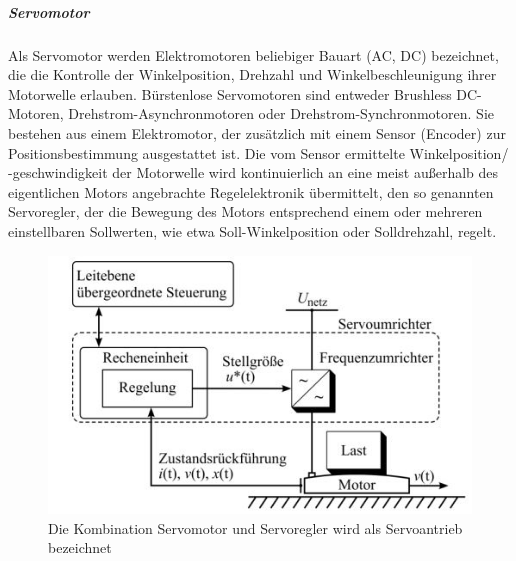 					\subparagraph{Servomotor}
						Als Servomotor werden Elektromotoren beliebiger Bauart (AC, DC) bezeichnet, die die Kontrolle der Winkelposition, Drehzahl und Winkelbeschleunigung ihrer Motorwelle erlauben. Bürstenlose Servomotoren sind entweder Brushless DC-Motoren, Drehstrom-Asynchronmotoren oder Drehstrom-Synchronmotoren. Sie bestehen aus einem Elektromotor, der zusätzlich mit einem Sensor (Encoder) zur Positionsbestimmung ausgestattet ist. Die vom Sensor ermittelte Winkelposition/ -geschwindigkeit der Motorwelle wird kontinuierlich an eine meist außerhalb des eigentlichen Motors angebrachte Regelelektronik übermittelt, den so genannten Servoregler, der die Bewegung des Motors entsprechend einem oder mehreren einstellbaren Sollwerten, wie etwa Soll-Winkelposition oder Solldrehzahl, regelt.
						\begin{figure}[h]
							\centering
							\includegraphics[width=0.5\linewidth]{./pics/el/servo}
							\caption{Die Kombination Servomotor und Servoregler wird als Servoantrieb bezeichnet}
	
						\end{figure}
						
